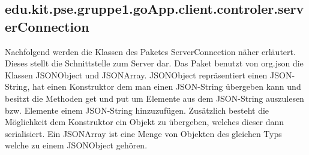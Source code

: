 	\subsection{edu.kit.pse.gruppe1.goApp.client.controler.serverConnection}
	 	Nachfolgend werden die Klassen des Paketes ServerConnection näher erläutert.
 	Dieses stellt die Schnittstelle zum Server dar. Das Paket benutzt von org.json die Klassen JSONObject und JSONArray.
 	JSONObject repräsentiert einen JSON-String, hat einen Konstruktor dem man einen JSON-String übergeben kann und besitzt die Methoden get und put um Elemente aus dem JSON-String auszulesen bzw. Elemente einem JSON-String hinzuzufügen.
 	Zusätzlich besteht die Möglichkeit dem Konstruktor ein Objekt zu übergeben, welches dieser dann serialisiert.
 	Ein JSONArray ist eine Menge von Objekten des gleichen Typs welche zu einem JSONObject gehören.
 	
